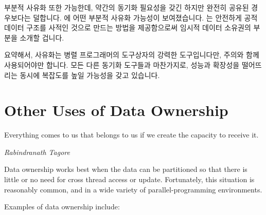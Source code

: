부분적 사유화 또한 가능한데, 약간의 동기화 필요성을 갖긴 하지만 완전히 공유된
경우보다는 덜합니다.
 에 어떤 부분적 사유화 가능성이
보여졌습니다.
 는 안전하게 공적 데이터 구조를 사적인 것으로
만드는 방법을 제공함으로써 임시적 데이터 소유권의 부분을 소개할 겁니다.

요약해서, 사유화는 병렬 프로그래머의 도구상자의 강력한 도구입니다만, 주의와
함께 사용되어야만 합니다.
모든 다른 동기화 도구들과 마찬가지로, 성능과 확장성을 떨어뜨리는 동시에
복잡도를 높일 가능성을 갖고 있습니다.

\iffalse

Partial privatization is also possible, with some synchronization
requirements, but less than in the fully shared case.
Some partial-privatization possibilities were explored in
\cref{sec:toolsoftrade:Avoiding Data Races}.
\Cref{chp:Deferred Processing} will introduce a temporal component
to data ownership by providing ways of safely taking public data
structures private.

In short, privatization is a powerful tool in the parallel programmer's
toolbox, but it must nevertheless be used with care.
Just like every other synchronization primitive, it has the potential
to increase complexity while decreasing performance and scalability.

\fi

\section{Other Uses of Data Ownership}
\label{sec:owned:Other Uses of Data Ownership}
%
\epigraph{Everything comes to us that belongs to us if we create the
	  capacity to receive it.}
	 {\emph{Rabindranath Tagore}}

Data ownership works best when the data can be partitioned so that there
is little or no need for cross thread access or update.
Fortunately, this situation is reasonably common, and in a wide variety
of parallel-programming environments.

Examples of data ownership include:

